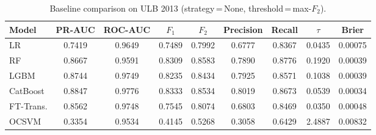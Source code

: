 \begin{table}[H]
\centering
\caption{Baseline comparison on ULB 2013 (strategy\,=\,None, threshold\,=\,max-$F_2$).}
\label{tab:baseline_ulb}
\begin{tabular}{l c c c c c c c c}
\toprule
Model & PR-AUC & ROC-AUC & $F_1$ & $F_2$ & Precision & Recall & $\tau$ & Brier \\
\midrule
LR         & 0.7419 & 0.9649 & 0.7489 & 0.7992 & 0.6777 & 0.8367 & 0.0435 & 0.00075 \\
RF         & 0.8667 & 0.9591 & 0.8309 & 0.8583 & 0.7890 & 0.8776 & 0.1920 & 0.00039 \\
LGBM       & 0.8744 & 0.9749 & 0.8235 & 0.8434 & 0.7925 & 0.8571 & 0.1038 & 0.00039 \\
CatBoost   & 0.8847 & 0.9776 & 0.8333 & 0.8534 & 0.8019 & 0.8673 & 0.0539 & 0.00034 \\
FT-Trans.  & 0.8562 & 0.9748 & 0.7545 & 0.8074 & 0.6803 & 0.8469 & 0.0350 & 0.00048 \\
OCSVM      & 0.3354 & 0.9534 & 0.4145 & 0.5268 & 0.3058 & 0.6429 & 2.4887 & 0.00832 \\
\bottomrule
\end{tabular}
\end{table}